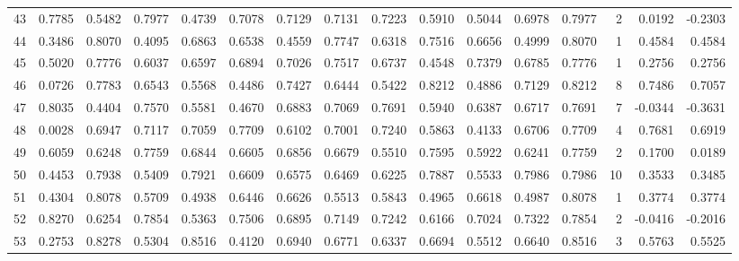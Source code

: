 \begin{tabular}{lrrrrrrrrrrrrrrr}
43  &      0.7785 &  0.5482 &  0.7977 &  0.4739 &  0.7078 &  0.7129 &  0.7131 &  0.7223 &  0.5910 &  0.5044 &   0.6978 &     0.7977 &      2 &                    0.0192 &                    -0.2303 \\
44  &      0.3486 &  0.8070 &  0.4095 &  0.6863 &  0.6538 &  0.4559 &  0.7747 &  0.6318 &  0.7516 &  0.6656 &   0.4999 &     0.8070 &      1 &                    0.4584 &                     0.4584 \\
45  &      0.5020 &  0.7776 &  0.6037 &  0.6597 &  0.6894 &  0.7026 &  0.7517 &  0.6737 &  0.4548 &  0.7379 &   0.6785 &     0.7776 &      1 &                    0.2756 &                     0.2756 \\
46  &      0.0726 &  0.7783 &  0.6543 &  0.5568 &  0.4486 &  0.7427 &  0.6444 &  0.5422 &  0.8212 &  0.4886 &   0.7129 &     0.8212 &      8 &                    0.7486 &                     0.7057 \\
47  &      0.8035 &  0.4404 &  0.7570 &  0.5581 &  0.4670 &  0.6883 &  0.7069 &  0.7691 &  0.5940 &  0.6387 &   0.6717 &     0.7691 &      7 &                   -0.0344 &                    -0.3631 \\
48  &      0.0028 &  0.6947 &  0.7117 &  0.7059 &  0.7709 &  0.6102 &  0.7001 &  0.7240 &  0.5863 &  0.4133 &   0.6706 &     0.7709 &      4 &                    0.7681 &                     0.6919 \\
49  &      0.6059 &  0.6248 &  0.7759 &  0.6844 &  0.6605 &  0.6856 &  0.6679 &  0.5510 &  0.7595 &  0.5922 &   0.6241 &     0.7759 &      2 &                    0.1700 &                     0.0189 \\
50  &      0.4453 &  0.7938 &  0.5409 &  0.7921 &  0.6609 &  0.6575 &  0.6469 &  0.6225 &  0.7887 &  0.5533 &   0.7986 &     0.7986 &     10 &                    0.3533 &                     0.3485 \\
51  &      0.4304 &  0.8078 &  0.5709 &  0.4938 &  0.6446 &  0.6626 &  0.5513 &  0.5843 &  0.4965 &  0.6618 &   0.4987 &     0.8078 &      1 &                    0.3774 &                     0.3774 \\
52  &      0.8270 &  0.6254 &  0.7854 &  0.5363 &  0.7506 &  0.6895 &  0.7149 &  0.7242 &  0.6166 &  0.7024 &   0.7322 &     0.7854 &      2 &                   -0.0416 &                    -0.2016 \\
53  &      0.2753 &  0.8278 &  0.5304 &  0.8516 &  0.4120 &  0.6940 &  0.6771 &  0.6337 &  0.6694 &  0.5512 &   0.6640 &     0.8516 &      3 &                    0.5763 &                     0.5525 \\

\end{tabular}

